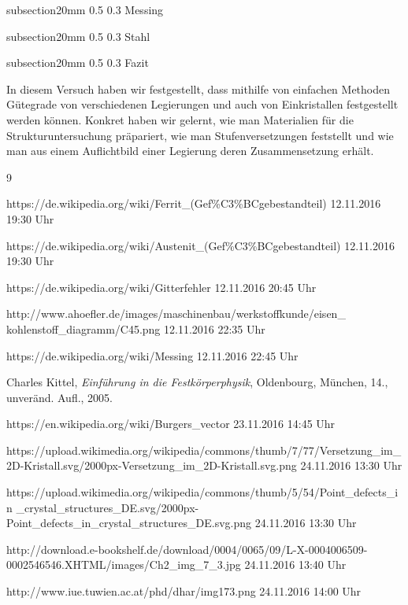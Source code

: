 \documentclass[german, %
parskip=full, %
bibliography=totoc, %
]{scrartcl}
\makeatletter
\renewcommand\subsection{\@startsection 
   {subsection}{2}{0mm}%
   {0.5\baselineskip}%
   {0.3\baselineskip}%
   {\bfseries\sffamily\large}%
   }
\makeatother
\begin{document}
\subsection{Messing}

\subsection{Stahl}

\subsection{Fazit}

In diesem Versuch haben wir festgestellt, dass mithilfe von einfachen Methoden Gütegrade von verschiedenen Legierungen und auch von Einkristallen festgestellt werden können. Konkret haben wir gelernt, wie man Materialien für die Strukturuntersuchung präpariert, wie man Stufenversetzungen feststellt und wie man aus einem Auflichtbild einer Legierung deren Zusammensetzung erhält. 


\begin{thebibliography}{9}

  https://de.wikipedia.org/wiki/Ferrit\_(Gef\%C3\%BCgebestandteil)
	12.11.2016
	19:30 Uhr
	
  https://de.wikipedia.org/wiki/Austenit\_(Gef\%C3\%BCgebestandteil)
	12.11.2016
	19:30 Uhr
	
  https://de.wikipedia.org/wiki/Gitterfehler
	12.11.2016
	20:45 Uhr	
	
  http://www.ahoefler.de/images/maschinenbau/werkstoffkunde/eisen\_
	kohlenstoff\_diagramm/C45.png
	12.11.2016
	22:35 Uhr	
	
  https://de.wikipedia.org/wiki/Messing
	12.11.2016
	22:45 Uhr	
	
  Charles Kittel,
  \emph{Einführung in die Festkörperphysik},
  Oldenbourg, München,
  14., unveränd. Aufl.,
  2005.
  
  https://en.wikipedia.org/wiki/Burgers\_vector
	23.11.2016
	14:45 Uhr
	
  https://upload.wikimedia.org/wikipedia/commons/thumb/7/77/Versetzung\_im\_2D-Kristall.svg/2000px-Versetzung\_im\_2D-Kristall.svg.png
	24.11.2016
	13:30 Uhr
	
  https://upload.wikimedia.org/wikipedia/commons/thumb/5/54/Point\_defects\_in
	\_crystal\_structures\_DE.svg/2000px-Point\_defects\_in\_crystal\_structures\_DE.svg.png
	24.11.2016
	13:30 Uhr	
	
  http://download.e-bookshelf.de/download/0004/0065/09/L-X-0004006509-0002546546.XHTML/images/Ch2\_img\_7\_3.jpg
	24.11.2016
	13:40 Uhr
	
  http://www.iue.tuwien.ac.at/phd/dhar/img173.png
	24.11.2016
	14:00 Uhr

\end{thebibliography}
\end{document}
